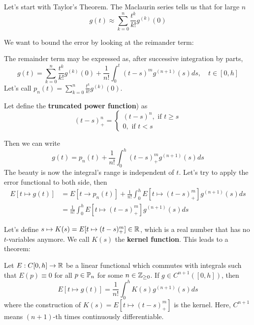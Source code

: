\documentclass{article}
\begin{document}
Let's start with Taylor's Theorem. The Maclaurin series tells us that for large $n$
\[g(t) \approx \sum_{k = 0}^n \frac{t^k}{k!} g^{(k)}(0)\]

We want to bound the error by looking at the reimander term:
\begin{theorem} The remainder term may be expressed as, after successive integration by parts,
    \[g(t) = \sum_{k = 0}^n \frac{t^k}{k!} g^{(k)}(0) + \frac{1}{n!} \int_0^t (t - s)^m g^{(n+1)}(s) ds, \quad t \in [0, h] \]
    Let's call $p_n(t) = \sum_{k = 0}^n \frac{t^k}{k!} g^{(k)}(0)$.
\end{theorem}

Let define the \textbf{truncated power function}) as
\[(t - s)^n_+ = \begin{cases}
    (t - s)^n, \text{ if $t \geq s$}\\
    0, \text{ if $t < s$}
\end{cases}\]

Then we can write
\[g(t) = p_n(t) + \frac{1}{n!} \int_0^h (t - s)^m_+ g^{(n+1)}(s) ds\]
The beauty is now the integral's range is independent of $t$. Let's try to apply the error functional to both side, then
\begin{align*}
    E[t \mapsto g(t)] &= E[t \to p_n(t)] + \frac{1}{n!} \int_0^h E[t \mapsto (t - s)^m_+] g^{(n+1)}(s) ds \tag*{Fubini's Theorem}\\
    &= \frac{1}{n!} \int_0^h E[t \mapsto (t - s)^m_+] g^{(n+1)}(s) ds \tag*{By Hypothesis, $E[t to p_n(t)] = 0$}
\end{align*}

Let's define $s \mapsto K(s) = E[t \mapsto (t - s)^m_+] \in \mathbb{R}$, which is a real number that has no $t$-variables anymore. We call $K(s)$ the \textbf{kernel function}. This leads to a theorem:

\begin{theorem}
    Let $E: C[0, h] \to \mathbb{R}$ be a linear functional which commutes with integrals such that $E(p) \equiv 0$ for all $p \in \mathbb{P}_n$ for some $n \in \mathbb{Z}_{\geq 0}$. If $g \in C^{n+1}([0, h])$, then 
    \[E[t \mapsto g(t)] = \frac{1}{n!} \int_0^h K(s) g^{(n+1)}(s) ds\]
    where the construction of $K(s) = E[t \mapsto (t - s)^m_+]$ is the kernel. Here, $C^{n+1}$ means $(n+1)$-th times continuously differentiable.
\end{theorem}
\end{document}
